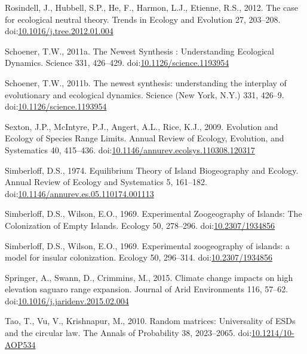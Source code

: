 \hypertarget{ref-Rosindell2012}{}
Rosindell, J., Hubbell, S.P., He, F., Harmon, L.J., Etienne, R.S., 2012.
The case for ecological neutral theory. Trends in Ecology and Evolution
27, 203--208.
doi:\href{https://doi.org/10.1016/j.tree.2012.01.004}{10.1016/j.tree.2012.01.004}

\hypertarget{ref-Schoener2011a}{}
Schoener, T.W., 2011a. The Newest Synthesis : Understanding Ecological
Dynamics. Science 331, 426--429.
doi:\href{https://doi.org/10.1126/science.1193954}{10.1126/science.1193954}

\hypertarget{ref-Schoener2011}{}
Schoener, T.W., 2011b. The newest synthesis: understanding the interplay
of evolutionary and ecological dynamics. Science (New York, N.Y.) 331,
426--9.
doi:\href{https://doi.org/10.1126/science.1193954}{10.1126/science.1193954}

\hypertarget{ref-Sexton2009}{}
Sexton, J.P., McIntyre, P.J., Angert, A.L., Rice, K.J., 2009. Evolution
and Ecology of Species Range Limits. Annual Review of Ecology,
Evolution, and Systematics 40, 415--436.
doi:\href{https://doi.org/10.1146/annurev.ecolsys.110308.120317}{10.1146/annurev.ecolsys.110308.120317}

\hypertarget{ref-Simberloff1974a}{}
Simberloff, D.S., 1974. Equilibrium Theory of Island Biogeography and
Ecology. Annual Review of Ecology and Systematics 5, 161--182.
doi:\href{https://doi.org/10.1146/annurev.es.05.110174.001113}{10.1146/annurev.es.05.110174.001113}

\hypertarget{ref-Simberloff1969}{}
Simberloff, D.S., Wilson, E.O., 1969. Experimental Zoogeography of
Islands: The Colonization of Empty Islands. Ecology 50, 278--296.
doi:\href{https://doi.org/10.2307/1934856}{10.2307/1934856}

\hypertarget{ref-Simberloff1969a}{}
Simberloff, D.S., Wilson, E.O., 1969. Experimental zoogeography of
islands: a model for insular colonization. Ecology 50, 296--314.
doi:\href{https://doi.org/10.2307/1934856}{10.2307/1934856}

\hypertarget{ref-Springer2015}{}
Springer, A., Swann, D., Crimmins, M., 2015. Climate change impacts on
high elevation saguaro range expansion. Journal of Arid Environments
116, 57--62.
doi:\href{https://doi.org/10.1016/j.jaridenv.2015.02.004}{10.1016/j.jaridenv.2015.02.004}

\hypertarget{ref-Tao2010}{}
Tao, T., Vu, V., Krishnapur, M., 2010. Random matrices: Universality of
ESDs and the circular law. The Annals of Probability 38, 2023--2065.
doi:\href{https://doi.org/10.1214/10-AOP534}{10.1214/10-AOP534}

